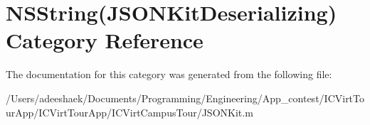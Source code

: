 \hypertarget{category_n_s_string_07_j_s_o_n_kit_deserializing_08}{\section{N\-S\-String(J\-S\-O\-N\-Kit\-Deserializing) Category Reference}
\label{category_n_s_string_07_j_s_o_n_kit_deserializing_08}
}


The documentation for this category was generated from the following file\-:\begin{DoxyCompactItemize}
\item 
/\-Users/adeeshaek/\-Documents/\-Programming/\-Engineering/\-App\-\_\-contest/\-I\-C\-Virt\-Tour\-App/\-I\-C\-Virt\-Tour\-App/\-I\-C\-Virt\-Campus\-Tour/J\-S\-O\-N\-Kit.\-m\end{DoxyCompactItemize}
